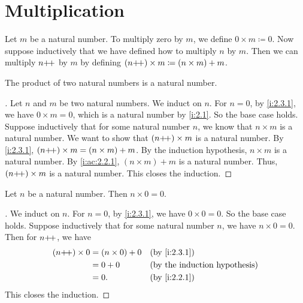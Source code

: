\section{Multiplication}\label{i:sec:2.3}

\begin{defn}\label{i:2.3.1}
  Let \(m\) be a natural number.
  To multiply zero by \(m\), we define \(0 \times m \coloneqq 0\).
  Now suppose inductively that we have defined how to multiply \(n\) by \(m\).
  Then we can multiply \(n{+}\!{+}\) by \(m\) by defining \((n{+}\!{+}) \times m \coloneqq (n \times m) + m\).
\end{defn}

\begin{ac}\label{i:ac:2.3.1}
  The product of two natural numbers is a natural number.
\end{ac}

\begin{proof}[]
  Let \(n\) and \(m\) be two natural numbers.
  We induct on \(n\).
  For \(n = 0\), by \cref{i:2.3.1}, we have \(0 \times m = 0\), which is a natural number by \cref{i:2.1}.
  So the base case holds.
  Suppose inductively that for some natural number \(n\), we know that \(n \times m\) is a natural number.
  We want to show that \((n{+}\!{+}) \times m\) is a natural number.
  By \cref{i:2.3.1}, \((n{+}\!{+}) \times m = (n \times m) + m\).
  By the induction hypothesis, \(n \times m\) is a natural number.
  By \cref{i:ac:2.2.1}, \((n \times m) + m\) is a natural number.
  Thus, \((n{+}\!{+}) \times m\) is a natural number.
  This closes the induction.
\end{proof}

\begin{ac}\label{i:ac:2.3.2}
  Let \(n\) be a natural number.
  Then \(n \times 0 = 0\).
\end{ac}

\begin{proof}[]
  We induct on \(n\).
  For \(n = 0\), by \cref{i:2.3.1}, we have \(0 \times 0 = 0\).
  So the base case holds.
  Suppose inductively that for some natural number \(n\), we have \(n \times 0 = 0\).
  Then for \(n{+}\!{+}\), we have
  \begin{align*}
    (n\pp) \times 0 & = (n \times 0) + 0 &  & \by{i:2.3.1} \\
                    & = 0 + 0            &  & \byIH        \\
                    & = 0.               &  & \by{i:2.2.1}
  \end{align*}
  This closes the induction.
\end{proof}

